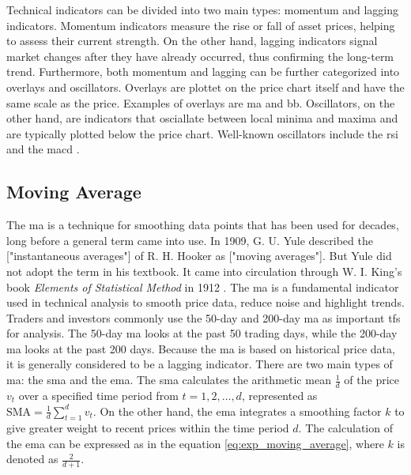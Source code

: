 \noindent
Technical indicators can be divided into two main types: momentum and lagging indicators. Momentum indicators measure the rise or fall of asset prices, helping to assess their current strength. On the other hand, lagging indicators signal market changes after they have already occurred, thus confirming the long-term trend.
\newline
\newline
Furthermore, both momentum and lagging can be further categorized into overlays and oscillators. Overlays are plottet on the price chart itself and have the same scale as the price. Examples of overlays are \gls{ma} and \gls{bb}. Oscillators, on the other hand, are indicators that osciallate between local minima and maxima and are typically plotted below the price chart. Well-known oscillators include the \gls{rsi} and the \gls{macd} \citep{Chen_2021}.

\subsection{Moving Average}
\label{sub:MA}
The \gls{ma} is a technique for smoothing data points that has been used for decades, long before a general term came into use. In 1909, G. U. Yule \citep{yule1909applications} described the ["instantaneous averages"] of R. H. Hooker \citep{hooker1901correlation} as ["moving averages"]. But Yule did not adopt the term in his textbook. It came into circulation through W. I. King's book \textit{Elements of Statistical Method} in 1912 \citep{king1912elements}.
\newline
\newline
The \gls{ma} is a fundamental indicator used in technical analysis to smooth price data, reduce noise and highlight trends. Traders and investors commonly use the 50-day and 200-day \gls{ma} as important \glspl{tf} for analysis. The 50-day \gls{ma} looks at the past 50 trading days, while the 200-day \gls{ma} looks at the past 200 days. Because the \gls{ma} is based on historical price data, it is generally considered to be a lagging indicator.
\newline
\newline
There are two main types of \gls{ma}: the \gls{sma} and the \gls{ema}. The \gls{sma} calculates the arithmetic mean $\frac{1}{d}$ of the price $v_t$ over a specified time period from $t = 1, 2, \dots, d$, represented as $\text{SMA} = \frac{1}{d} \sum_{t=1}^d v_t$. On the other hand, the \gls{ema} integrates a smoothing factor $k$ to give greater weight to recent prices within the time period $d$. The calculation of the \gls{ema} can be expressed as in the equation \ref{eq:exp_moving_average}, where $k$ is denoted as $\frac{2}{d + 1}$.

